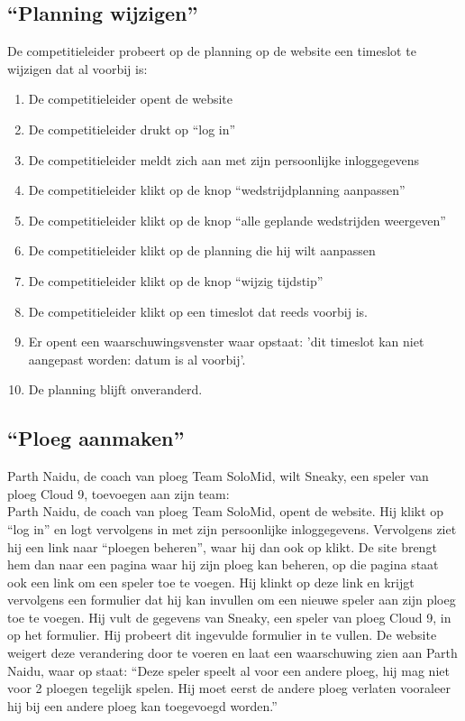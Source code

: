 \documentclass[12pt,a4paper]{article}
\begin{document}
			\subsection{``Planning wijzigen''}
			De competitieleider probeert op de planning op de website een timeslot te wijzigen dat al voorbij is:
			\begin{enumerate}
				\item De competitieleider opent de website
				\item De competitieleider drukt op “log in” 
				\item De competitieleider meldt zich aan met zijn persoonlijke inloggegevens
				\item De competitieleider klikt op de knop ``wedstrijdplanning aanpassen'' 
				\item De competitieleider klikt op de knop ``alle geplande wedstrijden weergeven''
				\item De competitieleider klikt op de planning die hij wilt aanpassen
				\item De competitieleider klikt op de knop ``wijzig tijdstip''
				\item De competitieleider klikt op een timeslot dat reeds voorbij is.
				\item Er opent een waarschuwingsvenster waar opstaat: 'dit timeslot kan niet aangepast worden: datum is al voorbij'.
				\item De planning blijft onveranderd.
			\end{enumerate}
			\subsection{``Ploeg aanmaken''}
			Parth Naidu, de coach van ploeg Team SoloMid, wilt Sneaky, een speler van ploeg Cloud 9, toevoegen aan zijn team:
			\\
			Parth Naidu, de coach van ploeg Team SoloMid, opent de website. Hij klikt op ``log in'' en logt vervolgens in met zijn persoonlijke inloggegevens. Vervolgens ziet hij een link naar ``ploegen beheren'', waar hij dan ook op klikt. De site brengt hem dan naar een pagina waar hij zijn ploeg kan beheren, op die pagina staat ook een link om een speler toe te voegen. Hij klinkt op deze link en krijgt vervolgens een formulier dat hij kan invullen om een nieuwe speler aan zijn ploeg toe te voegen. Hij vult de gegevens van Sneaky, een speler van ploeg Cloud 9, in op het formulier. Hij probeert dit ingevulde formulier in te vullen. De website weigert deze verandering door te voeren en laat een waarschuwing zien aan Parth Naidu, waar op staat: ``Deze speler speelt al voor een andere ploeg, hij mag niet voor 2 ploegen tegelijk spelen. Hij moet eerst de andere ploeg verlaten vooraleer hij bij een andere ploeg kan toegevoegd worden.''
\end{document}
